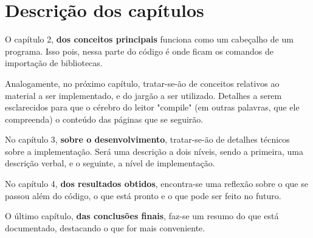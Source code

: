 \section{Descrição dos capítulos}
\label{sec:description}

O capítulo 2, \textbf{dos conceitos principais} funciona como um cabeçalho de um
programa. Isso pois, nessa parte do código é onde ficam os comandos de
importação de bibliotecas.

Analogamente, no próximo capítulo, tratar-se-ão de conceitos relativos ao
material a ser implementado, e do jargão a ser utilizado. Detalhes a serem
esclarecidos para que o cérebro do leitor "compile" (em outras palavras,
que ele compreenda) o conteúdo das páginas que se seguirão.

No capítulo 3, \textbf{sobre o desenvolvimento}, tratar-se-ão de detalhes técnicos sobre a
implementação. Será uma descrição a dois níveis, sendo a primeira, uma descrição
verbal, e o seguinte, a nível de implementação.

No capítulo 4, \textbf{dos resultados obtidos}, encontra-se uma reflexão sobre o
que se passou além do código, o que está pronto e o que pode ser feito no futuro.

O último capítulo, \textbf{das conclusões finais}, faz-se um resumo do que está
documentado, destacando o que for mais conveniente.

